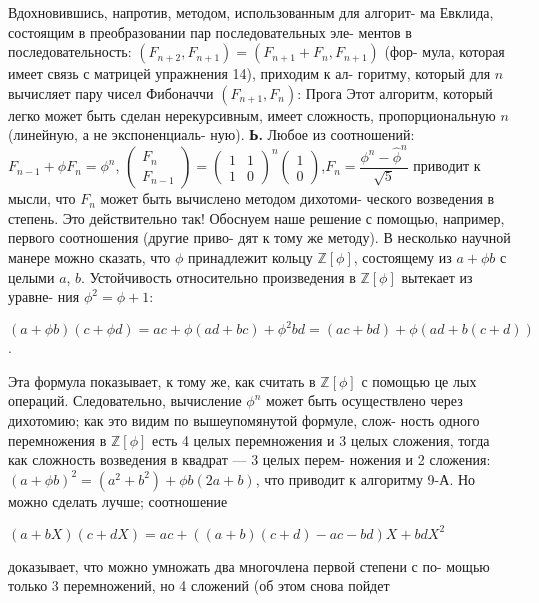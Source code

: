 \documentclass{mai_book}
\begin{document}
Вдохновившись, напротив, методом, использованным для алгорит-
ма Евклида, состоящим в преобразовании пар последовательных эле-
ментов в последовательность: $(F_{n+2},F_{n+1})=(F_{n+1}+F_n,F_{n+1})$ (фор-
мула, которая имеет связь с матрицей упражнения 14), приходим к ал-
горитму, который для $n$ вычисляет пару чисел Фибоначчи $(F_{n+1},F_n)$:\newline
Прога\newline
Этот алгоритм, который легко может быть сделан нерекурсивным,
имеет сложность, пропорциональную $n$ (линейную, а не экспоненциаль-
ную).\newline
\hspace*{15pt}\textbf{Ь.} Любое из соотношений:\newline
$F_{n-1}+\phi F_n=\phi^n$,\hspace{20pt}
$\begin{pmatrix}
F_n \\ F_{n-1}
\end{pmatrix}=
\begin{pmatrix}
1 & 1 \\ 1 & 0
\end{pmatrix}^n
\begin{pmatrix}
1 \\ 0
\end{pmatrix}$,\hspace{20pt}$F_n=\dfrac{\phi^n-\hat{\phi}^n}{\sqrt{5}}$\newline
приводит к мысли, что $F_n$ может быть вычислено методом дихотоми-
ческого возведения в степень. Это действительно так! Обоснуем наше
решение с помощью, например, первого соотношения (другие приво-
дят к тому же методу). В несколько научной манере можно сказать,
что $\phi$ принадлежит кольцу $\mathbb{Z}[\phi]$, состоящему из $a+\phi b$ с целыми $a$, $b$.
Устойчивость относительно произведения в $\mathbb{Z}[\phi]$ вытекает из уравне-
ния $\phi^2=\phi+1$:
\begin{center}
$(a+\phi b)(c+\phi d)=ac+\phi(ad+bc)+\phi^2bd=(ac+bd)+\phi(ad+b(c+d))$.
\end{center}
Эта формула показывает, к тому же, как считать в $\mathbb{Z}[\phi]$ с помощью це
лых операций. Следовательно, вычисление $\phi^n$ может быть осуществлено
через дихотомию; как это видим по вышеупомянутой формуле, слож-
ность одного перемножения в $\mathbb{Z}[\phi]$ есть 4 целых перемножения и 3 целых
сложения, тогда как сложность возведения в квадрат — 3 целых перем-
ножения и 2 сложения: $(a+\phi b)^2=(a^2+b^2)+\phi b(2a+b)$, что приводит
к алгоритму 9-А.\newline
\hspace*{15pt}Но можно сделать лучше; соотношение
\begin{center}
$(a+bX)(c+dX)=ac+\left((a+b)(c+d)-ac-bd\right)X+bdX^2$
\end{center}
доказывает, что можно умножать два многочлена первой степени с по-
мощью только 3 перемножений, но 4 сложений (об этом снова пойдет
\newpage
\end{document}
